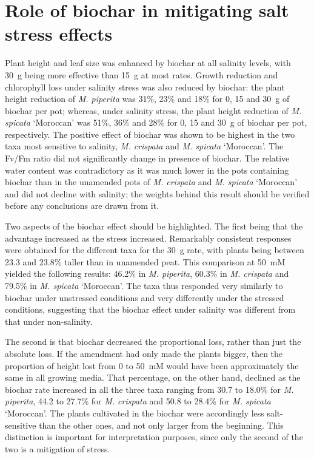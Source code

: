 \section{Role of biochar in mitigating salt stress effects}

Plant height and leaf size was enhanced by biochar at all salinity levels, with 30~g being more effective than 15~g at most rates. Growth reduction and chlorophyll loss under salinity stress was also reduced by biochar: the plant height reduction of \textit{M. piperita} was 31\%, 23\% and 18\% for 0, 15 and 30~g of biochar per pot; whereas, under salinity stress, the plant height reduction of \textit{M. spicata} `Moroccan' was 51\%, 36\% and 28\% for 0, 15 and 30~g of biochar per pot, respectively. The positive effect of biochar was shown to be highest in the two taxa most sensitive to salinity, \textit{M. crispata} and \textit{M. spicata} `Moroccan'. The Fv/Fm ratio did not significantly change in presence of biochar. The relative water content was contradictory as it was much lower in the pots containing biochar than in the unamended pots of \textit{M. crispata} and \textit{M. spicata} `Moroccan' and did not decline with salinity; the weights behind this result should be verified before any conclusions are drawn from it.

Two aspects of the biochar effect should be highlighted. The first being that the advantage increased as the stress increased. Remarkably consistent responses were obtained for the different taxa for the 30~g rate, with plants being between 23.3 and 23.8\% taller than in unamended peat. This comparison at 50~mM yielded the following results: 46.2\% in \textit{M. piperita}, 60.3\% in \textit{M. crispata} and 79.5\% in \textit{M. spicata} `Moroccan'. The taxa thus responded very similarly to biochar under unstressed conditions and very differently under the stressed conditions, suggesting that the biochar effect under salinity was different from that under non-salinity.

The second is that biochar decreased the proportional loss, rather than just the absolute loss. If the amendment had only made the plants bigger, then the proportion of height lost from 0 to 50~mM would have been approximately the same in all growing media. That percentage, on the other hand, declined as the biochar rate increased in all the three taxa ranging from 30.7 to 18.0\% for \textit{M. piperita}, 44.2 to 27.7\% for \textit{M. crispata} and 50.8 to 28.4\% for \textit{M. spicata} `Moroccan'. The plants cultivated in the biochar were accordingly less salt-sensitive than the other ones, and not only larger from the beginning. This distinction is important for interpretation purposes, since only the second of the two is a mitigation of stress.

